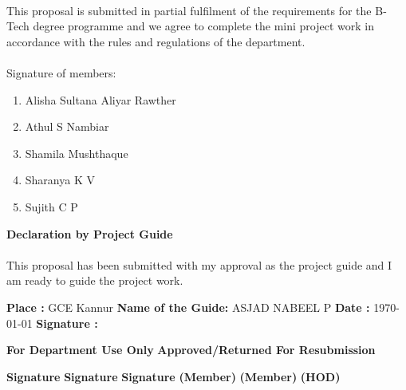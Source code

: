 \documentclass[12pt,a4paper]{article}
\begin{document}
\begin{flushleft}
		\paragraph{} This proposal is submitted in partial fulfilment of the requirements for the B-Tech degree programme and we agree to complete the mini project work in accordance with the rules and regulations of the department.
		
		\paragraph{} Signature of members:
		
		\begin{enumerate}
			\item Alisha Sultana Aliyar Rawther
			\item Athul S Nambiar
			\item Shamila Mushthaque
			\item Sharanya K V
			\item Sujith C P \newline
		\end{enumerate}


		\begin{center}
			{\Large \textbf{Declaration by Project Guide} }
		\end{center}
		\paragraph{} This proposal has been submitted with my approval as the project guide and I am ready to guide the project work.\newline
		
		\textbf{Place : } GCE Kannur \hfill		\textbf{Name of the Guide:} ASJAD NABEEL P
		\newline
		\newline
		\textbf{Date  : }\today \hspace{7.5em} \textbf{Signature : }
		\newline
		\newline
		\newline
		

		\begin{center}
			{\Large\textbf{For Department Use Only}\hspace{20em}
		\textbf{Approved/Returned For Resubmission}}
		\end{center}



		\vspace{5em}
		\textbf{Signature} \hspace{10em}
		\textbf{Signature} \hspace{10em}
		\textbf{Signature}
		\newline
		\textbf{(Member)} \hspace{9.6em}
		\textbf{(Member)} \hspace{10.5em}
		\textbf{(HOD)}

		
		

\end{flushleft}
\end{document}
